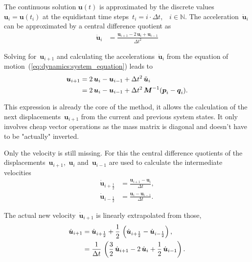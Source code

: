 The continuous solution $\boldsymbol{u}(t)$ is approximated by the discrete values~$\boldsymbol{u}_i = \boldsymbol{u}(t_{i})$ at the equidistant time steps~$t_i = i\cdot\Delta t$,\ \ $i \in \mathbb{N}$.
The acceleration~$\ddot{\boldsymbol{u}}_i$ can be approximated by a central difference quotient as
%
\begin{align}
\ddot{\boldsymbol{u}}_i &= \frac{\boldsymbol{u}_{i+1} - 2\,\boldsymbol{u}_{i} + \boldsymbol{u}_{i-1}}{\Delta t^2}\label{eq:dynamics:difference_acceleration}
\end{align}

Solving for~$\boldsymbol{u}_{i+1}$ and calculating the accelerations~$\ddot{\boldsymbol{u}}_{i}$ from the equation of motion~(\ref{eq:dynamics:system_equation}) leads to
%
\begin{align}
\boldsymbol{u}_{i+1} &= 2\,\boldsymbol{u}_{i} - \boldsymbol{u}_{i-1} + \Delta t^2\,\ddot{\boldsymbol{u}}_{i}\notag\\
&= 2\,\boldsymbol{u}_{i} - \boldsymbol{u}_{i-1} + \Delta t^2\,\boldsymbol{M}^{-1}(\boldsymbol{p}_i - \boldsymbol{q}_i).
\end{align}

This expression is already the core of the method, it allows the calculation of the next displacements~$\boldsymbol{u}_{i+1}$ from the current and previous system states.
It only involves cheap vector operations as the mass matrix is diagonal and doesn't have to be "actually" inverted.

Only the velocity is still missing. For this the central difference quotients of the displacements~$\boldsymbol{u}_{i+1}$,~$\boldsymbol{u}_{i}$ and~$\boldsymbol{u}_{i-1}$ are used to calculate the intermediate velocities
%
\begin{align}
\dot{\boldsymbol{u}}_{i+\frac{1}{2}} &= \frac{\boldsymbol{u}_{i+1} - \boldsymbol{u}_{i}}{\Delta t},\\
\dot{\boldsymbol{u}}_{i-\frac{1}{2}} &= \frac{\boldsymbol{u}_{i} - \boldsymbol{u}_{i-1}}{\Delta t}.
\end{align} 

The actual new velocity~$\dot{\boldsymbol{u}}_{i+1}$ is linearly extrapolated from those,
%
\begin{align}
\dot{\boldsymbol{u}}_{i+1} &= \dot{\boldsymbol{u}}_{i+\frac{1}{2}} + \frac{1}{2}\,\left(\dot{\boldsymbol{u}}_{i+\frac{1}{2}} - \dot{\boldsymbol{u}}_{i-\frac{1}{2}}\right),\notag\\
&= \frac{1}{\Delta t}\,\left(\frac{3}{2}\,\dot{\boldsymbol{u}}_{i+1} - 2\,\dot{\boldsymbol{u}}_{i} + \frac{1}{2}\,\dot{\boldsymbol{u}}_{i-1}\right).
\end{align}

